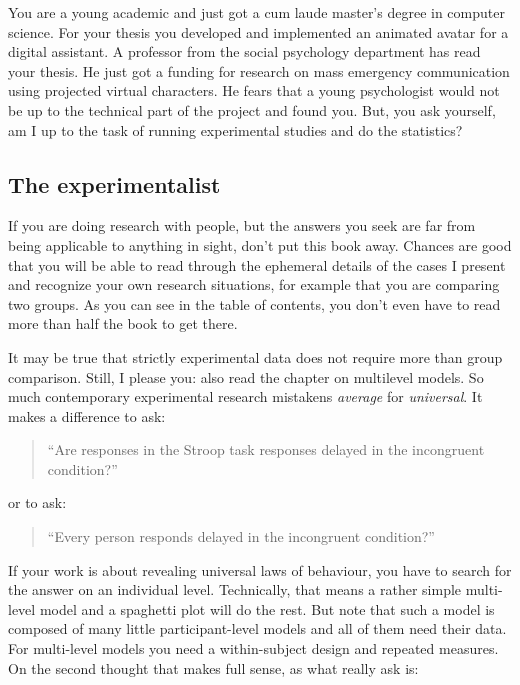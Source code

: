 \documentclass[]{svmono}
\theoremstyle{definition}
\theoremstyle{definition}
\theoremstyle{definition}
\theoremstyle{remark}
\begin{document}
You are a young academic and just got a cum laude master's degree in
computer science. For your thesis you developed and implemented an
animated avatar for a digital assistant. A professor from the social
psychology department has read your thesis. He just got a funding for
research on mass emergency communication using projected virtual
characters. He fears that a young psychologist would not be up to the
technical part of the project and found you. But, you ask yourself, am I
up to the task of running experimental studies and do the statistics?

\subsection{The experimentalist}\label{the-experimentalist}

If you are doing research with people, but the answers you seek are far
from being applicable to anything in sight, don't put this book away.
Chances are good that you will be able to read through the ephemeral
details of the cases I present and recognize your own research
situations, for example that you are comparing two groups. As you can
see in the table of contents, you don't even have to read more than half
the book to get there.

It may be true that strictly experimental data does not require more
than group comparison. Still, I please you: also read the chapter on
multilevel models. So much contemporary experimental research mistakens
\emph{average} for \emph{universal}. It makes a difference to ask:

\begin{quote}
``Are responses in the Stroop task responses delayed in the incongruent
condition?''
\end{quote}

or to ask:

\begin{quote}
``Every person responds delayed in the incongruent condition?''
\end{quote}

If your work is about revealing universal laws of behaviour, you have to
search for the answer on an individual level. Technically, that means a
rather simple multi-level model and a spaghetti plot will do the rest.
But note that such a model is composed of many little participant-level
models and all of them need their data. For multi-level models you need
a within-subject design and repeated measures. On the second thought
that makes full sense, as what really ask is:
\end{document}
